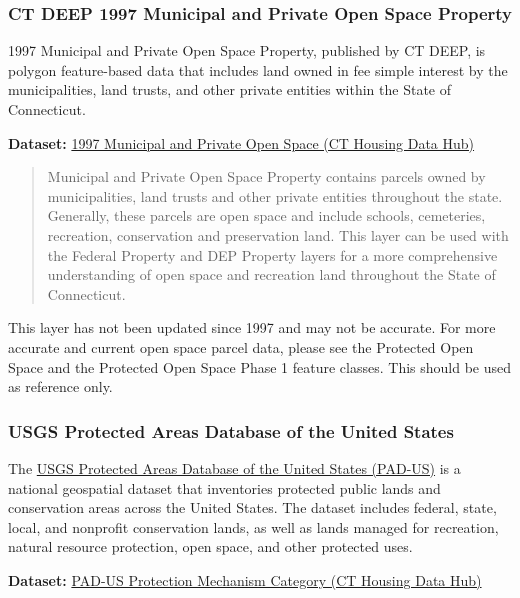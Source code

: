 \documentclass[
  letterpaper,
  DIV=11,
  numbers=noendperiod]{scrreprt}
\begin{document}
\subsubsection{CT DEEP 1997 Municipal and Private Open Space
Property}\label{sec-ct-deep-1997-municipal-and-private-open-space-property}

1997 Municipal and Private Open Space Property, published by CT DEEP, is
polygon feature-based data that includes land owned in fee simple
interest by the municipalities, land trusts, and other private entities
within the State of Connecticut.

\textbf{Dataset:}
\href{https://housingmaps.ct.gov/datasets/CTDEEP::1997-municipal-and-private-open-space/about}{1997
Municipal and Private Open Space (CT Housing Data Hub)}

\begin{quote}
Municipal and Private Open Space Property contains parcels owned by
municipalities, land trusts and other private entities throughout the
state. Generally, these parcels are open space and include schools,
cemeteries, recreation, conservation and preservation land. This layer
can be used with the Federal Property and DEP Property layers for a more
comprehensive understanding of open space and recreation land throughout
the State of Connecticut.
\end{quote}

This layer has not been updated since 1997 and may not be accurate. For
more accurate and current open space parcel data, please see the
Protected Open Space and the Protected Open Space Phase 1 feature
classes. This should be used as reference only.

\subsubsection{USGS Protected Areas Database of the United
States}\label{sec-usgs-protected-areas-database-of-the-united-states}

The
\href{https://www.usgs.gov/programs/gap-analysis-project/science/pad-us-data-overview}{USGS
Protected Areas Database of the United States (PAD-US)} is a national
geospatial dataset that inventories protected public lands and
conservation areas across the United States. The dataset includes
federal, state, local, and nonprofit conservation lands, as well as
lands managed for recreation, natural resource protection, open space,
and other protected uses.

\textbf{Dataset:}
\href{https://housingmaps.ct.gov/datasets/USGS::pad-us-protection-mechanism-category/about}{PAD-US
Protection Mechanism Category (CT Housing Data Hub)}
\end{document}
